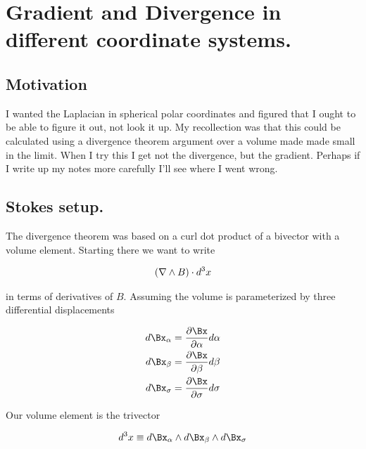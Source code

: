 

\chapter{Gradient and Divergence in different coordinate systems.}
\label{chap:gradientAltCoord}
{}
\date{Aug 22, 2009}

\beginArtWithToc

\section{Motivation}

I wanted the Laplacian in spherical polar coordinates and figured that I ought to be able to figure it out, not look it up.  My recollection was that this could be calculated using a divergence theorem argument over a volume made made small in the limit.  When I try this I get not the divergence, but the gradient.  Perhaps if I write up my notes more carefully I'll see where I went wrong.

\section{Stokes setup.}

The  divergence theorem was based on a curl dot product of a bivector with a volume element.  Starting there we want to write

\begin{align}\label{eqn:foo1}
(\nabla \wedge B) \cdot d^3 x
\end{align}

in terms of derivatives of $B$.  Assuming the volume is parameterized by three differential displacements

\begin{align*}
d\Bx_\alpha &= \PD{\alpha}{\Bx} d\alpha \\
d\Bx_\beta &= \PD{\beta}{\Bx} d\beta \\
d\Bx_\sigma &= \PD{\sigma}{\Bx} d\sigma
\end{align*}

Our volume element is the trivector

\begin{align}\label{eqn:foo2}
d^3 x \equiv d\Bx_\alpha  \wedge d\Bx_\beta  \wedge d\Bx_\sigma
\end{align}

